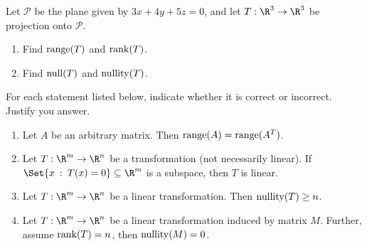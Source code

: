 \begin{exercises}
\begin{problist}
		\prob Let $\mathcal P$ be the plane given by $3x+4y+5z=0$, and let $T:\R^3\to\R^3$ be projection onto $\mathcal P$. 
		\begin{enumerate}
		    \item Find $\operatorname{range}(T)$ and $\operatorname{rank}(T)$.
		    \item Find $\operatorname{null}(T)$ and $\operatorname{nullity}(T)$.
		\end{enumerate}
		\prob For each statement listed below, indicate whether it is correct or incorrect. Justify you answer.
		\begin{enumerate}
		    \item Let $A$ be an arbitrary matrix. Then $\operatorname{range}(A)=\operatorname{range}(A^T)$.
		    \item Let $T:\R^m\to\R^n$ be a transformation (not necessarily linear). If $\Set{x \given T(x)=0} \subseteq \R^m$ is a subspace, then $T$ is linear.
		    \item Let $T:\R^m\to\R^n$ be a linear transformation. Then $\operatorname{nullity}(T) \geq n$.
		    \item Let $T:\R^m\to\R^n$ be a linear transformation induced by matrix $M$. Further, assume $\operatorname{rank}(T) = n$, then $\operatorname{nullity}(M) = 0$.
		\end{enumerate}

	\end{problist}
\end{exercises}
